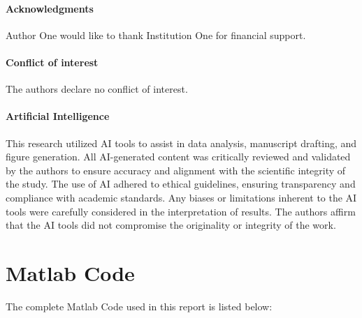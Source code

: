 \documentclass[fleqn]{rbfin}
\begin{document}
\paragraph{Acknowledgments}
Author One would like to thank Institution One for financial support.

\paragraph{Conflict of interest} The authors declare no conflict of interest.

\paragraph{Artificial Intelligence} This research utilized AI tools to assist in data analysis, manuscript drafting, and figure generation. All AI-generated content was critically reviewed and validated by the authors to ensure accuracy and alignment with the scientific integrity of the study. The use of AI adhered to ethical guidelines, ensuring transparency and compliance with academic standards. Any biases or limitations inherent to the AI tools were carefully considered in the interpretation of results. The authors affirm that the AI tools did not compromise the originality or integrity of the work.

\label{refs}




\rbfinappendix
\section{Matlab Code}

The complete Matlab Code used in this report is listed below: 
\end{document}
